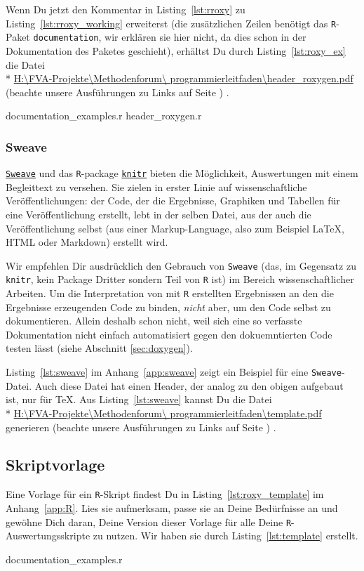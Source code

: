 \documentclass[twoside]{scrreprt}
\providecommand{\R}{\texttt{R}}
\providecommand{\code}[1]{\texttt{#1}}
\providecommand{\proot}{%
H:\textbackslash{}FVA-Projekte\textbackslash{}Methodenforum\textbackslash{}%
}
\providecommand{\pdir}{\proot{}programmierleitfaden\textbackslash{}}
\begin{document}
Wenn Du jetzt den Kommentar in  Listing~\ref{lst:rroxy} zu
Listing~\ref{lst:rroxy_working}
erweiterst (die zus\"a{}tzlichen Zeilen ben\"o{}tigt das \R{}-Paket
\code{documentation}, wir erkl\"a{}ren sie hier nicht, da dies schon in der
Dokumentation des Paketes geschieht),
erh\"altst Du durch Listing~\ref{lst:roxy_ex} die Datei \\* 
\href{header_roxygen.pdf}{\pdir{}header\_roxygen.pdf} 
(beachte unsere Ausf\"u{}hrungen zu Links auf Seite \pageref{page:links})
. 

{documentation_examples.r}
%
{header_roxygen.r}

\subsubsection{Sweave}
\href{http://www.stat.uni-muenchen.de/~leisch/Sweave/}{\code{Sweave}} und das
\R{}-package
\href{http://cran.r-project.org/web/packages/knitr/index.html}{\code{knitr}}
bieten die M\"o{}glichkeit, Auswertungen mit einem Begleittext zu versehen.
Sie zielen in erster Linie auf wissenschaftliche Ver\"o{}ffentlichungen: der
Code, der die Ergebnisse, Graphiken und Tabellen f\"u{}r eine
Ver\"o{}ffentlichung erstellt, lebt in der selben Datei, aus der auch die
Ver\"o{}ffentlichung selbst (aus einer Markup-Language, also zum Beispiel
\LaTeX{}, HTML oder Markdown) erstellt wird.

Wir empfehlen Dir ausdr\"u{}cklich den Gebrauch von \code{Sweave} (das, im
Gegensatz zu \code{knitr}, kein Package Dritter sondern Teil von \R{} ist) im
Bereich wissenschaftlicher Arbeiten.
Um die Interpretation von mit \R{} erstellten Ergebnissen an den die Ergebnisse
erzeugenden Code zu binden, \emph{nicht} aber, um den Code selbst zu
dokumentieren.
Allein deshalb schon nicht, weil sich eine so verfasste Dokumentation nicht
einfach automatisiert gegen den dokuemntierten Code testen l\"a{}sst (siehe
Abschnitt \ref{sec:doxygen}).

Listing~\ref{lst:sweave} im Anhang~\ref{app:sweave} zeigt ein Beispiel
f\"u{}r eine \code{Sweave}-Datei.
Auch diese Datei hat einen Header, der analog zu den obigen aufgebaut ist, nur
f\"u{}r \TeX{}.
Aus  Listing~\ref{lst:sweave} kannst Du die Datei \\*
\href{%
template.pdf}{%
\pdir{}template.pdf} 
generieren
(beachte unsere Ausf\"u{}hrungen zu Links auf Seite \pageref{page:links})
.

\subsection{Skriptvorlage
 }
Eine Vorlage f\"ur ein \R{}-Skript findest Du in Listing~\ref{lst:roxy_template}
im Anhang~\ref{app:R}.
Lies sie aufmerksam, passe sie an Deine Bed\"u{}rfnisse an und gew\"o{}hne Dich
daran, Deine Version dieser Vorlage f\"u{}r alle Deine \R{}-Auswertungsskripte
zu nutzen.
Wir haben sie durch Listing~\ref{lst:template} erstellt.

{documentation_examples.r}
\end{document}
